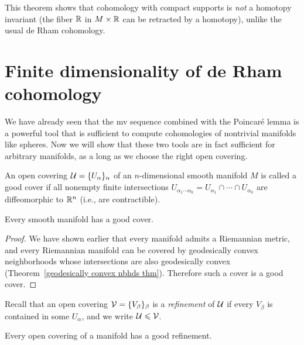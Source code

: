 \begin{rem}
    This theorem shows that cohomology with compact supports is \emph{not} a homotopy invariant (the fiber $\mathbb{R}$ in $M\times\mathbb{R}$ can be retracted by a homotopy), unlike the usual de Rham cohomology.
\end{rem}





\section{Finite dimensionality of de Rham cohomology}\label{finite dim de rham}

We have already seen that the \gls{mv} sequence combined with the Poincar\'e lemma is a powerful tool that is sufficient to compute cohomologies of nontrivial manifolds like spheres. Now we will show that these two tools are in fact sufficient for arbitrary manifolds, as a long as we choose the right open covering.

\begin{defn}
    An open covering $\mathcal{U}=\{U_\alpha\}_\alpha$ of an $n$-dimensional smooth manifold $M$ is called a good cover if all nonempty finite intersections $U_{\alpha_1\cdots\alpha_k}=U_{\alpha_1}\cap \cdots\cap U_{\alpha_k}$ are diffeomorphic to $\mathbb{R}^n$ (i.e., are contractible).
\end{defn}

\begin{prop}
    Every smooth manifold has a good cover.
\end{prop}
\begin{proof}
     We have shown earlier that every manifold admits a Riemannian metric, and every Riemannian manifold can be covered by geodesically convex neighborhoods whose intersections are also geodesically convex (Theorem~\ref{geodesically convex nbhds thm}). Therefore such a cover is a good cover.
\end{proof}

Recall that an open covering $\mathcal{V}=\{V_\beta\}_\beta$ is a \emph{refinement} of $\mathcal{U}$ if every $V_\beta$ is contained in some $U_\alpha$, and we write $\mathcal{U}\leqslant \mathcal{V}$.

\begin{cor}
    Every open covering of a manifold has a good refinement.
\end{cor}

